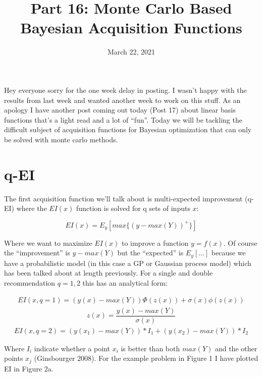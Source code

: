 \documentclass[12pt]{article}
\title{Part 16: Monte Carlo Based Bayesian Acquisition Functions}
\begin{document}
\date{March 22, 2021}
\maketitle

Hey everyone sorry for the one week delay in posting. I wasn't happy with the results from last week and wanted another week to work on this stuff. As an apology I have another post coming out today (Post 17) about linear basis functions that's a light read and a lot of ``fun''. Today we will be tackling the difficult subject of acquisition functions for Bayesian optimization that can only be solved with monte carlo methods.

\section{q-EI}

The first acquisition function we'll talk about is multi-expected improvement (q-EI) where the $EI(x)$ function is solved for q sets of inputs $x$:

\begin{equation}
EI(x)=E_y[max\{(y-max(Y))^+\}]
\end{equation}

\vspace{5mm}

Where we want to maximize $EI(x)$ to improve a function $y=f(x)$. Of course the ``improvement'' is $y-max(Y)$ but the ``expected'' is $E_y[...]$ because we have a probabilistic model (in this case a GP or Gaussian process model) which has been talked about at length previously. For a single and double recommendation $q=1,2$ this has an analytical form:

\begin{align*}
EI(x,q=1)=(y(x)-max(Y))\Phi(z(x))+\sigma(x) \phi(z(x))
\end{align*}
\begin{align*}
z(x)=\dfrac{y(x)-max(Y)}{\sigma(x)}
\end{align*}
\begin{align*}
EI(x,q=2)=(y(x_1)-max(Y))*I_1+(y(x_2)-max(Y))*I_2
\end{align*}

\vspace{5mm}

Where $I_i$ indicate whether a point $x_i$ is better than both $max(Y)$ and the other points $x_j$ (Ginsbourger 2008). For the example problem in Figure 1 I have plotted EI in Figure 2a. 
\end{document}
